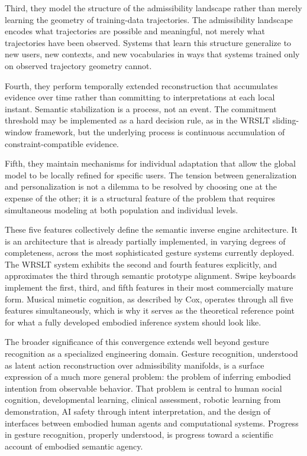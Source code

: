 \documentclass[11pt, a4paper]{article}
\theoremstyle{definition}
\begin{document}
Third, they model the structure of the admissibility landscape rather than merely learning the geometry of training-data trajectories. The admissibility landscape encodes what trajectories are possible and meaningful, not merely what trajectories have been observed. Systems that learn this structure generalize to new users, new contexts, and new vocabularies in ways that systems trained only on observed trajectory geometry cannot.

Fourth, they perform temporally extended reconstruction that accumulates evidence over time rather than committing to interpretations at each local instant. Semantic stabilization is a process, not an event. The commitment threshold may be implemented as a hard decision rule, as in the WRSLT sliding-window framework, but the underlying process is continuous accumulation of constraint-compatible evidence.

Fifth, they maintain mechanisms for individual adaptation that allow the global model to be locally refined for specific users. The tension between generalization and personalization is not a dilemma to be resolved by choosing one at the expense of the other; it is a structural feature of the problem that requires simultaneous modeling at both population and individual levels.

These five features collectively define the semantic inverse engine architecture. It is an architecture that is already partially implemented, in varying degrees of completeness, across the most sophisticated gesture systems currently deployed. The WRSLT system exhibits the second and fourth features explicitly, and approximates the third through semantic prototype alignment. Swipe keyboards implement the first, third, and fifth features in their most commercially mature form. Musical mimetic cognition, as described by Cox, operates through all five features simultaneously, which is why it serves as the theoretical reference point for what a fully developed embodied inference system should look like.

The broader significance of this convergence extends well beyond gesture recognition as a specialized engineering domain. Gesture recognition, understood as latent action reconstruction over admissibility manifolds, is a surface expression of a much more general problem: the problem of inferring embodied intention from observable behavior. That problem is central to human social cognition, developmental learning, clinical assessment, robotic learning from demonstration, AI safety through intent interpretation, and the design of interfaces between embodied human agents and computational systems. Progress in gesture recognition, properly understood, is progress toward a scientific account of embodied semantic agency.
\end{document}
